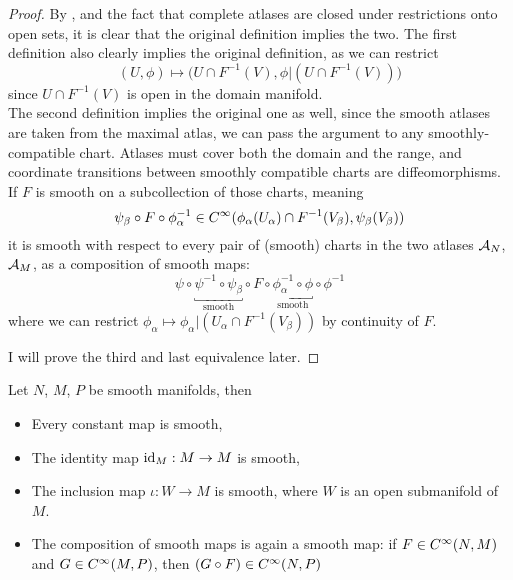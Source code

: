 \documentclass[../main-manifolds.tex]{subfiles}
\begin{document}
\begin{proof}
    By , and the fact that complete atlases are closed under restrictions onto open sets, it is clear that the original definition implies the two. The first definition also clearly implies the original definition, as we can restrict 
    \[(U,\phi)\mapsto \biggl(U\cap F^{-1}(V),\phi|(U\cap F^{-1}(V))\biggr)\]
    since $U\cap F^{-1}(V)$ is open in the domain manifold.\\

    The second definition implies the original one as well, since the smooth atlases are taken from the maximal atlas, we can pass the argument to any smoothly-compatible chart. Atlases must cover both the domain and the range, and coordinate transitions between smoothly compatible charts are diffeomorphisms. If $F$ is smooth on a subcollection of those charts, meaning
    \[
        \psi_\beta\circ F\circ\phi_\alpha^{-1}\in \cinf[\phi_\alpha(U_\alpha)\cap F^{-1}(V_\beta),\psi_\beta(V_\beta)]
    \]
    it is smooth with respect to every pair of (smooth) charts in the two atlases $\mathcal{A}_{N}$, $\mathcal{A}_{M}$, as a composition of smooth maps:
    \[
        \psi\circ \underbracket{\psi^{-1}\circ \psi_\beta}_{\text{smooth}}\circ F\circ\underbracket{\phi_\alpha^{-1}\circ \phi}_{\text{smooth}}\circ\phi^{-1}
    \]
    where we can restrict $\phi_\alpha\mapsto \phi_\alpha|(U_\alpha\cap F^{-1}(V_\beta))$ by continuity of $F$.

    I will prove the third and last equivalence later.
\end{proof}
\begin{wts}\label{lee-chp2:sources-of-smooth-maps}
    Let $N$, $M$, $P$ be smooth manifolds, then
    \begin{itemize}
        \item Every constant map is smooth,
        \item The identity map $\operatorname{id}_{M}:M\to M$ is smooth,
        \item The inclusion map $\iota: W\to M$ is smooth, where $W$ is an open submanifold of $M$.
        \item The composition of smooth maps is again a smooth map: if $F\in \cinf[N,M]$ and $G\in \cinf[M,P]$, then $(G\circ F)\in\cinf[N,P]$
    \end{itemize}
\end{wts}
\end{document}
